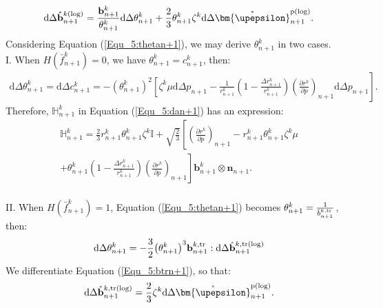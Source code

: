 \begin{equation}
\label{Equ_5:dbn+1}
\text{d} \Delta \mathring {\mathbf{b}}_{n + 1}^{k(\log) } = \frac{{{\mathbf{b}}_{n + 1}^k}}{{\theta _{n + 1}^k}}{\text{d}} \Delta \theta _{n + 1}^k + \frac{2}{3}\theta _{n + 1}^k{\zeta ^k}{\text{d}}\Delta \mathring {\bm{\upepsilon}}_{n + 1}^{\rm p(\log) }.
\end{equation}
Considering Equation (\ref{Equ_5:thetan+1}), we may derive $\theta _{n + 1}^k$ in two cases.\\
I. When $H\left( {\bar f_{n + 1}^k} \right) = 0$, we have $\theta _{n + 1}^k = c_{n + 1}^k$, then:
\begin{equation}
\begin{aligned}
{\text{d}} \Delta \theta _{n + 1}^k = {\text{d}} \Delta c_{n + 1}^k =  - {\left( {\theta _{n + 1}^k} \right)^2} \left[ {\zeta ^k}\mu {\text{d}}\Delta {p_{n + 1}} - \frac{1}{{r_{n + 1}^k}}\left( {1 - \frac{{\Delta r_{n + 1}^k}}{{r_{n + 1}^k}}} \right)\right.
\left.{{\left( {\frac{{\partial {r^k}}}{{\partial p}}} \right)}_{n + 1}}{\text{d}}\Delta {p_{n + 1}} \right].
\end{aligned}
\end{equation}
Therefore, $\mathbb{H}_{n + 1}^k$ in Equation (\ref{Equ_5:dan+1}) has an expression:
\begin{equation}
\begin{aligned}
\mathbb{H}_{n + 1}^k = \frac{2}{3}r_{n + 1}^k\theta _{n + 1}^k{\zeta ^k}\mathbb{I} + \sqrt {\frac{2}{3}} \left[ {{\left( {\frac{{\partial {r^k}}}{{\partial p}}} \right)}_{n + 1}} - r_{n + 1}^k\theta _{n + 1}^k{\zeta ^k}\mu \right.\\
\left. + \theta _{n + 1}^k\left( {1 - \frac{{\Delta r_{n + 1}^k}}{{r_{n + 1}^k}}} \right){{\left( {\frac{{\partial {r^k}}}{{\partial p}}} \right)}_{n + 1}} \right]{\mathbf{b}}_{n + 1}^k \otimes {{\mathbf{n}}_{n + 1}}.
\end{aligned}
\end{equation}\\
II. When $H\left( {\bar f_{n + 1}^k} \right) = 1$, Equation (\ref{Equ_5:thetan+1}) becomes $\theta _{n + 1}^k = \frac{1}{{\bar b_{n + 1}^{k,\rm tr}}}$, then:
\begin{equation}
\label{Equ_5:thetan+1}
{\text{d}} \Delta \theta _{n + 1}^k =  - \frac{3}{2}{\left( {\theta _{n + 1}^k} \right)^3}{\mathbf{b}}_{n + 1}^{k,\rm tr}:\text{d} \Delta \mathring {\mathbf{b}}_{n + 1}^{k,\rm tr(\log) }
\end{equation}
We differentiate Equation (\ref{Equ_5:btrn+1}), so that:
\begin{equation}
\label{Equ_5:dbtrn+1}
\text{d} \Delta \mathring {\mathbf{b}}_{n + 1}^{k,\rm tr(\log) } = \frac{2}{3}{\zeta ^k}{\text{d}}\Delta \mathring {\bm{\upepsilon}}_{n + 1}^{\rm p(\log) }.
\end{equation}
